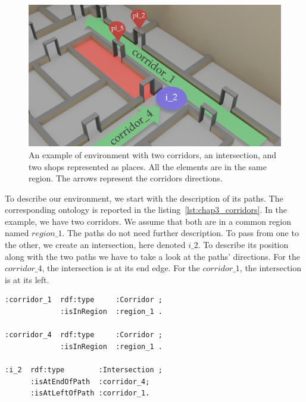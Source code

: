 \begin{figure}[ht!]
\centering
\includegraphics[scale=0.16]{figures/chapter3/SSR_example.png}
\caption{\label{fig:chap3_example} An example of environment with two corridors, an intersection, and two shops represented as places. All the elements are in the same region. The arrows represent the corridors directions.}
\end{figure}

To describe our environment, we start with the description of its paths. The corresponding ontology is reported in the listing~\ref{lst:chap3_corridors}. In the example, we have two corridors. We assume that both are in a common region named $region\_1$. The paths do not need further description. To pass from one to the other, we create an intersection, here denoted $i\_2$. To describe its position along with the two paths we have to take a look at the paths' directions. For the $corridor\_4$, the intersection is at its end edge. For the $corridor\_1$, the intersection is at its left.

\begin{lstlisting}[frame=single, basicstyle=\scriptsize\ttfamily, label={lst:chap3_corridors}, caption={Description of the two corridors and their common intersection in the OWL language using the Turle syntax.},captionpos=b, style=OwlTurtle_indiv]
:corridor_1  rdf:type     :Corridor ;
             :isInRegion  :region_1 .
             
:corridor_4  rdf:type     :Corridor ;
             :isInRegion  :region_1 .
             
:i_2  rdf:type        :Intersection ;
      :isAtEndOfPath  :corridor_4;
      :isAtLeftOfPath :corridor_1.
\end{lstlisting}

